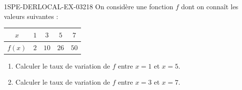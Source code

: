 \begin{exercice}{1SPE-DERLOCAL-EX-032}{1}{8}
On considère une fonction $f$ dont on connaît les valeurs suivantes :

\begin{center}
\begin{tabular}{|c|c|c|c|c|}
\hline
$x$ & $1$ & $3$ & $5$ & $7$ \\
\hline
$f(x)$ & $2$ & $10$ & $26$ & $50$ \\
\hline
\end{tabular}
\end{center}

\begin{enumerate}
\item Calculer le taux de variation de $f$ entre $x=1$ et $x=5$.
\item Calculer le taux de variation de $f$ entre $x=3$ et $x=7$.
\end{enumerate}
\end{exercice}
